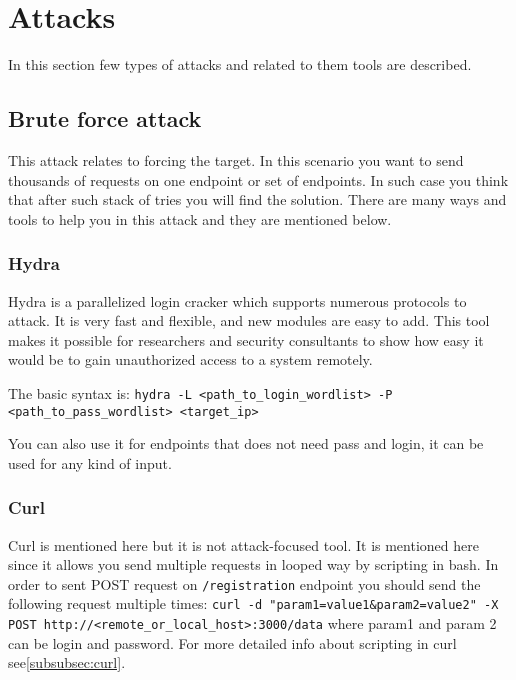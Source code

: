 \documentclass{article}[12pt]
\begin{document}



\section{Attacks}

In this section few types of attacks and related to them tools are described.

\subsection{Brute force attack}
\label{subsec:bruteforce}
This attack relates to forcing the target.
In this scenario you want to send thousands of requests on one endpoint or set of endpoints.
In such case you think that after such stack of tries you will find the solution.
There are many ways and tools to help you in this attack and they are mentioned below.

\subsubsection{Hydra}
\label{subsubsec:hydra}
Hydra is a parallelized login cracker which supports numerous protocols to attack.
It is very fast and flexible, and new modules are easy to add.
This tool makes it possible for researchers and security consultants to show how easy it would be to gain unauthorized access to a system remotely.

The basic syntax is: \texttt{hydra -L <path\_to\_login\_wordlist> -P <path\_to\_pass\_wordlist> <target\_ip> }

You can also use it for endpoints that does not need pass and login, it can be used for any kind of input.

\subsubsection{Curl}
Curl is mentioned here but it is not attack-focused tool.
It is mentioned here since it allows you send multiple requests in looped way by scripting in bash.
In order to sent POST request on \texttt{/registration} endpoint you should send the following request multiple times:\newline \newline
\texttt{curl -d "param1=value1\&param2=value2" -X POST http://<remote\_or\_local\_host>:3000/data} \newline
where param1 and param 2 can be login and password.
For more detailed info about scripting in curl see\ref{subsubsec:curl}.
\end{document}
